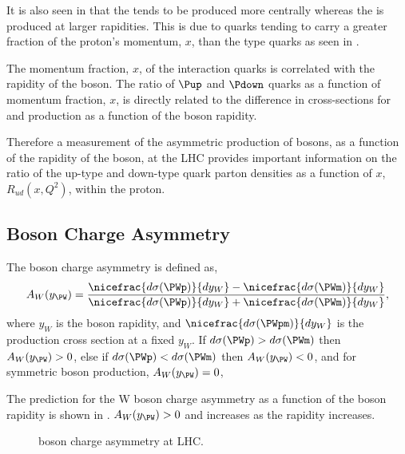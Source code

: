 It is also seen in  that the \PWm tends to be produced
more centrally whereas the \PWp is produced at larger rapidities. This is due
to \Pup quarks tending to carry a greater fraction of the proton's momentum,
$x$, than the \Pdown type quarks as seen in .

The momentum fraction, $x$, of the interaction quarks is correlated
with the rapidity of the \PW boson. The ratio of $\Pup$ and $\Pdown$ quarks as
a function of momentum fraction, $x$, is directly related to the difference in
cross-sections for \PWp and \PWm production as a function of the boson
rapidity.

Therefore a measurement of the asymmetric production of \PW bosons, as a
function of the rapidity of the boson, at the \ac{LHC} provides important
information on the ratio of the up-type and down-type quark parton densities as
a function of $x$,
$R_{ud}(x,Q^2)$, within the proton. 

\subsection{\PW Boson Charge Asymmetry}

The \PWpm boson charge asymmetry is defined as,
\begin{equation}
  A_{W}(y_{\PW})=
    \frac{ 
      \nicefrac{ d\sigma (\PWp) }{ dy_{W} } -
      \nicefrac{ d\sigma (\PWm) }{ dy_{W} }
    }
    {
      \nicefrac{ d\sigma (\PWp) }{ dy_{W} } +
      \nicefrac{ d\sigma (\PWm) }{ dy_{W} }
    }
,
\label{wbos:wasym}
\end{equation} 
where $y_{W}$ is the boson rapidity, and 
$\nicefrac{ d\sigma (\PWpm) }{ dy_{W} }$ is the \PWpm production cross section
at a fixed $y_{W}$.  
If $d\sigma(\PWp) > d\sigma(\PWm) $ then $A_{W}(y_{\PW})> 0$,
else if $d\sigma(\PWp) < d\sigma(\PWm) $ then $A_{W}(y_{\PW})< 0$,
and for symmetric \PWpm boson production, $A_{W}(y_{\PW})= 0$,

The prediction for the W boson charge asymmetry as a function of the boson
rapidity is shown in . $A_{W}(y_{\PW})> 0$ and
increases as the rapidity increases.

\begin{figure}[htbp]
  \centering
  \caption{\PW boson charge asymmetry at LHC.}
  \label{wbos:chargeasym}
\end{figure}

